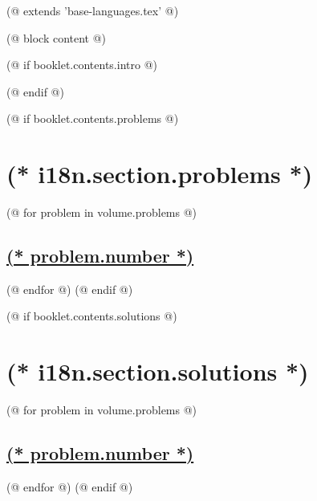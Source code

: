 (@ extends 'base-languages.tex' @)

(@ block content @)
    \setcounter{volume}{(* volume.number *)}%
    \pagestyle{main}

    (@ if booklet.contents.intro @)
        \thispagestyle{first}
        \afterpage{\aftergroup\restoregeometry}
        
        \newpage
    (@ endif @)

    (@ if booklet.contents.problems @)
        \section{(* i18n.section.problems *)}
        \pagestyle{problems}
        (@ for problem in volume.problems @)%
            \setcounter{problem}{(* problem.number *)}%
            \hypersetup{linkcolor=black}%
            \subsection{%
                \texorpdfstring{%
                    \hyperref[ssc:(* problem.id *)-answer]{(* problem.number *)}%
                }{%
                    (* problem.number *). (* problem.id *)%
                }%
            }%
            \label{ssc:(* problem.id*)-problem}%
            \hypersetup{linkcolor=colour-link}%
        (@ endfor @)
        \newpage
    (@ endif @)

    (@ if booklet.contents.solutions @)
        \section{(* i18n.section.solutions *)}
        \pagestyle{solutions}
        (@ for problem in volume.problems @)%
            \setcounter{problem}{(* problem.number *)}%
            \setcounter{equation}{0}%
            \setcounter{table}{0}%
            \setcounter{figure}{0}%
            \hypersetup{linkcolor=black}%
            \subsection{%
                \texorpdfstring{%
                    \hyperref[ssc:(* problem.id *)-problem]{(* problem.number *)}%
                }{%
                    (* problem.number *). (* problem.id *)%
                }%
            }%
            \label{ssc:(* problem.id*)-solution}%
            \hypersetup{linkcolor=colour-link}%
        (@ endfor @)
        \newpage
    (@ endif @)

